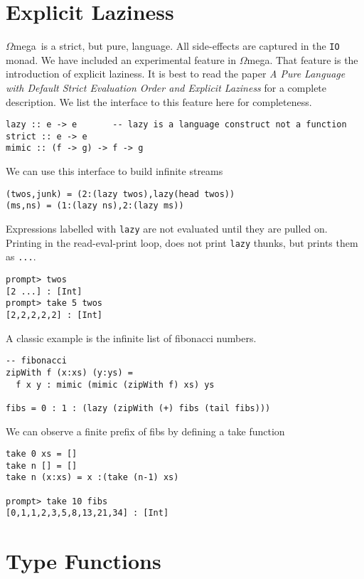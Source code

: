 \documentclass[11pt,twoside]{article}
\newcommand{\om}{$\Omega$mega}
\begin{document}
\section{Explicit Laziness} \label{lazy}
\om\ is a strict, but pure, language. All side-effects are captured
in the {\tt IO} monad. We have included an experimental feature in \om.
That feature is the introduction of explicit laziness. It is best
to read the paper
{\em A Pure Language with Default Strict Evaluation Order and Explicit Laziness}\cite{SheardStrict}
for a complete description. We list the interface to this feature
here for completeness.

\begin{verbatim}
lazy :: e -> e       -- lazy is a language construct not a function
strict :: e -> e
mimic :: (f -> g) -> f -> g
\end{verbatim}
We can use this interface to build infinite streams
\begin{verbatim}
(twos,junk) = (2:(lazy twos),lazy(head twos))
(ms,ns) = (1:(lazy ns),2:(lazy ms))
\end{verbatim}
Expressions labelled with {\tt lazy} are not evaluated until
they are pulled on. Printing in the read-eval-print loop, does not
print {\tt lazy} thunks, but prints them as {\tt ...}.
\begin{verbatim}
prompt> twos
[2 ...] : [Int]
prompt> take 5 twos
[2,2,2,2,2] : [Int]
\end{verbatim}

A classic example is the infinite list of fibonacci numbers.
\begin{verbatim}
-- fibonacci
zipWith f (x:xs) (y:ys) =
  f x y : mimic (mimic (zipWith f) xs) ys

fibs = 0 : 1 : (lazy (zipWith (+) fibs (tail fibs)))
\end{verbatim}

We can observe a finite prefix of fibs by defining a take function

\begin{verbatim}
take 0 xs = []
take n [] = []
take n (x:xs) = x :(take (n-1) xs)

prompt> take 10 fibs
[0,1,1,2,3,5,8,13,21,34] : [Int]
\end{verbatim}

\section{Type Functions} \label{typefun}
\end{document}
